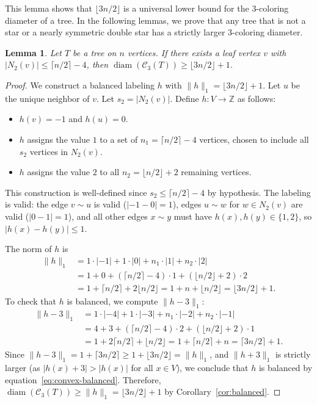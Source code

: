 \documentclass[12pt,reqno]{amsart}
\newtheorem{lem}[thm]{Lemma}
\theoremstyle{definition}
\newcommand{\C}{\mathcal{C}}
\newcommand{\Z}{\mathbb{Z}}
\newcommand{\diam}{\operatorname{diam}}
\begin{document}
This lemma shows that $\lfloor 3n/2\rfloor$ is a universal lower bound for the $3$-coloring diameter of a tree. In the following lemmas, we prove that any tree that is not a star or a nearly symmetric double star has a strictly larger $3$-coloring diameter.

\medskip 

\begin{lem}\label{lem:small-2-neighborhood}
Let $T$ be a tree on $n$ vertices. If there exists a leaf vertex $v$ with $|N_2(v)| \le \lceil n/2\rceil-4$, then $\diam(\C_3(T)) \ge \lfloor 3n/2\rfloor + 1$.
\end{lem}

\begin{proof}
We construct a balanced labeling $h$ with $\|h\|_1 = \lfloor 3n/2 \rfloor + 1$. Let $u$ be the unique neighbor of $v$. Let $s_2 = |N_2(v)|$. Define $h\colon V \to \Z$ as follows:
\begin{itemize}
    \item $h(v) = -1$ and $h(u) = 0$.
    \item $h$ assigns the value $1$ to a set of $n_1 = \lceil n/2 \rceil - 4$ vertices, chosen to include all $s_2$ vertices in $N_2(v)$.
    \item $h$ assigns the value $2$ to all $n_2 = \lfloor n/2 \rfloor + 2$ remaining vertices.
\end{itemize}
This construction is well-defined since $s_2 \le \lceil n/2 \rceil - 4$ by hypothesis. The labeling is valid: the edge $v \sim u$ is valid ($|-1-0|=1$), edges $u \sim w$ for $w \in N_2(v)$ are valid ($|0-1|=1$), and all other edges $x \sim y$ must have $h(x), h(y) \in \{1, 2\}$, so $|h(x)-h(y)| \le 1$.

The norm of $h$ is
\begin{align*}
\|h\|_1 &= 1\cdot|-1| + 1\cdot|0| + n_1 \cdot |1| + n_2 \cdot |2| \\
&= 1 + 0 + (\lceil n/2 \rceil - 4) \cdot 1 + (\lfloor n/2 \rfloor + 2) \cdot 2 \\
&= 1 + \lceil n/2 \rceil + 2\lfloor n/2 \rfloor = 1 + n + \lfloor n/2 \rfloor = \lfloor 3n/2 \rfloor + 1.
\end{align*}
To check that $h$ is balanced, we compute $\|h-3\|_1$:
\begin{align*}
\|h-3\|_1 &= 1\cdot|-4| + 1\cdot|-3| + n_1 \cdot |-2| + n_2 \cdot |-1| \\
&= 4 + 3 + (\lceil n/2 \rceil - 4) \cdot 2 + (\lfloor n/2 \rfloor + 2) \cdot 1 \\
&= 1 + 2\lceil n/2 \rceil + \lfloor n/2 \rfloor = 1+\lceil n/2 \rceil + n = \lceil 3n/2 \rceil+1.
\end{align*}
Since $\|h-3\|_1 = 1 + \lceil 3n/2 \rceil \ge 1 + \lfloor 3n/2 \rfloor = \|h\|_1$, and $\|h+3\|_1$ is strictly larger (as $|h(x)+3| > |h(x)|$ for all $x\in V$), we conclude that $h$ is balanced by equation~\eqref{eq:convex-balanced}. Therefore, $\diam(\C_3(T)) \ge \|h\|_1 = \lfloor 3n/2 \rfloor + 1$ by Corollary~\ref{cor:balanced}.
\end{proof}
\end{document}
